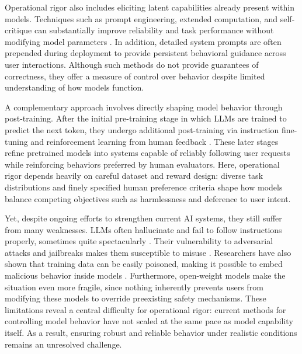 \documentclass{article}
\begin{document}
Operational rigor also includes eliciting latent capabilities already present within models.
Techniques such as prompt engineering, extended computation, and self-critique can substantially improve reliability and task performance without modifying model parameters \cite{wei2022chainofthought, madaan2023selfrefine}.
In addition, detailed system prompts are often prepended during deployment to provide persistent behavioral guidance across user interactions.
Although such methods do not provide guarantees of correctness, they offer a measure of control over behavior despite limited understanding of how models function.


A complementary approach involves directly shaping model behavior through post-training.
After the initial pre-training stage in which LLMs are trained to predict the next token, they undergo additional post-training via instruction fine-tuning and reinforcement learning from human feedback \cite{wei2022finetuned, Christiano2017RLHF, Ouyang2022TrainingLMsToFollowInstructions}.
These later stages refine pretrained models into systems capable of reliably following user requests while reinforcing behaviors preferred by human evaluators.
Here, operational rigor depends heavily on careful dataset and reward design: diverse task distributions and finely specified human preference criteria shape how models balance competing objectives such as harmlessness and deference to user intent.

Yet, despite ongoing efforts to strengthen current AI systems, they still suffer from many weaknesses.
LLMs often hallucinate and fail to follow instructions properly, sometimes quite spectacularly \cite{BBCNews2024_GoogleAISearchErrors, Barr2025_ReplitAI_CatastrophicDeletion}.
Their vulnerability to adversarial attacks and jailbreaks makes them susceptible to misuse \cite{xu-etal-2024-comprehensive, xu2025surveyattackslargelanguage, attacks_LVLMs}.
Researchers have also shown that training data can be easily poisoned, making it possible to embed malicious behavior inside models \cite{ramirez2022poisoning,zhao2025datapoisoning}.
Furthermore, open-weight models make the situation even more fragile, since nothing inherently prevents users from modifying these models to override preexisting safety mechanisms.
These limitations reveal a central difficulty for operational rigor: current methods for controlling model behavior have not scaled at the same pace as model capability itself.
As a result, ensuring robust and reliable behavior under realistic conditions remains an unresolved challenge.
\end{document}
